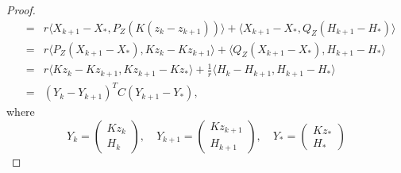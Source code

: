 \begin{itemize}
\begin{proof}
\begin{eqnarray*}
&=& r \langle X_{k+1} - X_*, P_Z (K(z_k - z_{k+1}))  \rangle + \langle X_{k+1} - X_*, Q_Z(H_{k+1} - H_*) \rangle \\
&=& r \langle  P_Z (X_{k+1} - X_*) , Kz_k - Kz_{k+1}   \rangle + \langle Q_Z (X_{k+1} - X_*), H_{k+1} - H_* \rangle  \\
&=& r \langle Kz_k - Kz_{k+1}, Kz_{k+1} - Kz_*  \rangle + \frac{1}{r} \langle H_{k} - H_{k+1}, H_{k+1} - H_* \rangle \\
&=& (Y_{k} - Y_{k+1})^T C (Y_{k+1} - Y_*),  
\end{eqnarray*}
where 
\begin{equation}
Y_k = \begin{pmatrix} 
      Kz_k \\
      H_k 
      \end{pmatrix}, \quad Y_{k+1} = \begin{pmatrix} 
      Kz_{k+1} \\
      H_{k+1}  
      \end{pmatrix}
,\quad Y_{*} = \begin{pmatrix} 
      Kz_{*} \\
      H_{*}  
      \end{pmatrix}
\end{equation}


\end{proof}
\end{itemize}
